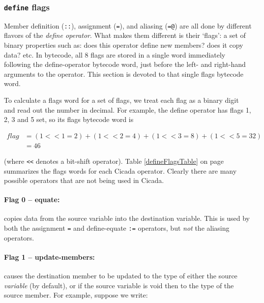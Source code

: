 \documentclass{article}
\begin{document}


\subsubsection{\texttt{define} flags} 

Member definition (\verb#::#), assignment (\verb#=#), and aliasing (\verb#=@#) are all done by different flavors of the \emph{define operator}.  What makes them different is their `flags':  a set of binary properties such as:  does this operator define new members? does it copy data? etc.  In bytecode, all 8 flags are stored in a single word immediately following the define-operator bytecode word, just before the left- and right-hand arguments to the operator.  This section is devoted to that single flags bytecode word.

To calculate a flags word for a set of flags, we treat each flag as a binary digit and read out the number in decimal.  For example, the define operator has flags 1, 2, 3 and 5 set, so its flags bytecode word is

\begin{align*}
flag &= (1 << 1 = 2) + (1 << 2 = 4) + (1 << 3 = 8) + (1 << 5 = 32)\\
&= 46
\end{align*}

\noindent (where \verb#<<# denotes a bit-shift operator).  Table \ref{defineFlagsTable} on page \pageref{defineFlagsTable} summarizes the flags words for each Cicada operator.  Clearly there are many possible operators that are not being used in Cicada.\\


\paragraph{Flag 0 -- equate:}  copies data from the source variable into the destination variable.  This is used by both the assignment \verb#=# and define-equate \verb#:=# operators, but \emph{not} the aliasing operators.\\


\paragraph{Flag 1 -- update-members:}  causes the destination member to be updated to the type of either the source \emph{variable} (by default), or if the source variable is void then to the type of the source member.  For example, suppose we write:
\end{document}
